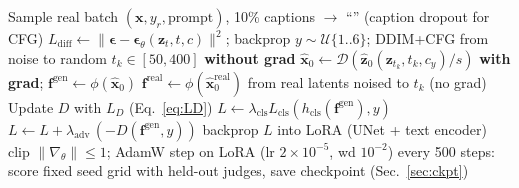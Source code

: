 \documentclass[twoside,english]{article}
\newcommand{\x}{\mathbf{x}}
\newcommand{\z}{\mathbf{z}}
\newcommand{\f}{\mathbf{f}}
\newcommand{\eps}{\boldsymbol{\epsilon}}
\newcommand{\hz}{\hat{\mathbf{z}}_0}
\newcommand{\hx}{\hat{\mathbf{x}}_0}
\begin{document}
\begin{algorithm}[!h]
\caption{One training step of classifier- and adversarially-guided LoRA fine-tuning}\label{alg:train}
\begin{algorithmic}[1]
\State Sample real batch $(\x,y_r,\text{prompt})$, 10\% captions $\to$ ``'' (caption dropout for CFG)
\State $L_{\text{diff}}\gets\|\eps-\eps_\theta(\z_t,t,c)\|^2$; \; backprop
  \State $y\sim\mathcal U\{1..6\}$; DDIM+CFG from noise to random $t_k\in[50,400]$ \textbf{without grad}
  \State $\hx\gets\mathcal D(\hz(\z_{t_k},t_k,c_y)/s)$ \textbf{with grad}; \; $\f^{\text{gen}}\gets\phi(\hx)$
  \State $\f^{\text{real}}\gets\phi(\hx^{\text{real}})$ from real latents noised to $t_k$ (no grad)
  \State Update $D$ with $L_D$ (Eq.~\ref{eq:LD})
  \State $L\gets\lambda_{\text{cls}}L_{\text{cls}}(h_{\text{cls}}(\f^{\text{gen}}),y)$ 
   $L\gets L+\lambda_{\text{adv}}\,(-D(\f^{\text{gen}},y))$ \EndIf
  \State backprop $L$ into LoRA (UNet + text encoder)
\EndIf
\State clip $\|\nabla_\theta\|\le1$; AdamW step on LoRA (lr $2\times10^{-5}$, wd $10^{-2}$)
\State every 500 steps: score fixed seed grid with held-out judges, save checkpoint (Sec.~\ref{sec:ckpt})
\end{algorithmic}
\end{algorithm}
\end{document}
